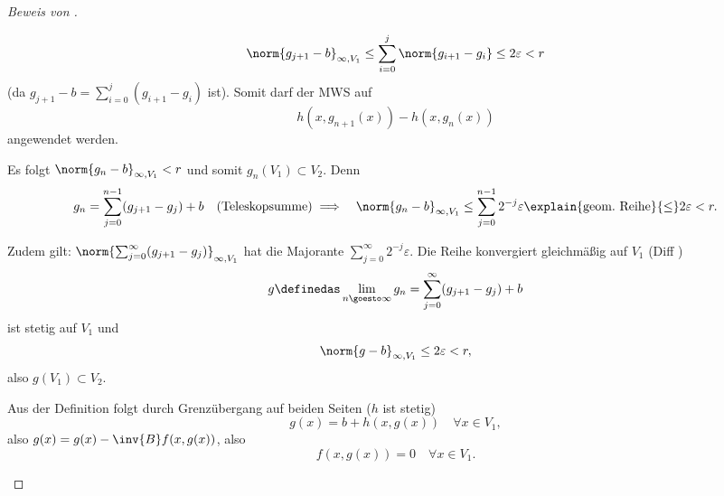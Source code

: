 \begin{proof}[Beweis von ]
\begin{proofenumerate}[label=\rechtsklammer{\arabic*}]
\begin{proofenumerate}[label=\rechtsklammer{\alph*}]
\begin{bemerkung*}
        \begin{equation*}
          \norm{g_{j+1}-b}_{\infty,V_1}\leq \sum_{i=0}^{j}\norm{g_{i+1}-g_i}\leq 2\varepsilon<r
        \end{equation*}
        (da \( g_{j+1}-b=\sum_{i=0}^{j}(g_{i+1}-g_i) \) ist). Somit darf der MWS auf
        \begin{equation*}
          h(x,g_{n+1}(x))-h(x,g_n(x))
        \end{equation*}
        angewendet werden.
      \end{bemerkung*}
      \item Es folgt \( \norm{g_n-b}_{\infty, V_1}<r \) und somit \( g_n(V_1)\subset V_2 \). Denn
      \begin{align*}
        &g_n=\sum_{j=0}^{n-1} (g_{j+1}-g_j)+b\quad (\text{Teleskopsumme})
        \implies &\norm{g_n-b}_{\infty,V_1}\leq \sum_{j=0}^{n-1}2^{-j}\varepsilon \explain{\text{geom.\ Reihe}}{\leq}2\varepsilon<r.
      \end{align*}
      \item Zudem gilt: \( \norm{\sum_{j=0}^{\infty}(g_{j+1}-g_j)}_{\infty,V_1} \) hat die Majorante \( \sum_{j=0}^{\infty}2^{-j}\varepsilon \). \timplies Die Reihe konvergiert gleichmäßig auf \( V_1 \) \timplies (Diff )
      \begin{equation*}
        g\definedas \lim_{n \goesto \infty} g_n=\sum_{j=0}^{\infty}(g_{j+1}-g_j)+b
      \end{equation*}
      ist stetig auf \( V_1 \) und
      \begin{equation*}
        \norm{g-b}_{\infty,V_1}\leq 2\varepsilon<r,
      \end{equation*}
      also \( g(V_1)\subset V_2 \).
    \end{proofenumerate}
    Aus der Definition folgt durch Grenzübergang auf beiden Seiten (\( h \) ist stetig)
    \begin{equation*}
      g(x)=b+h(x,g(x))\quad \forall x\in V_1,
    \end{equation*}
    also \( g(x)=g(x)-\inv{B}f(x,g(x)) \), also
    \begin{equation*}
      f(x,g(x))=0\quad \forall x\in V_1.
    \end{equation*}
  \end{proofenumerate}
\end{proof}
